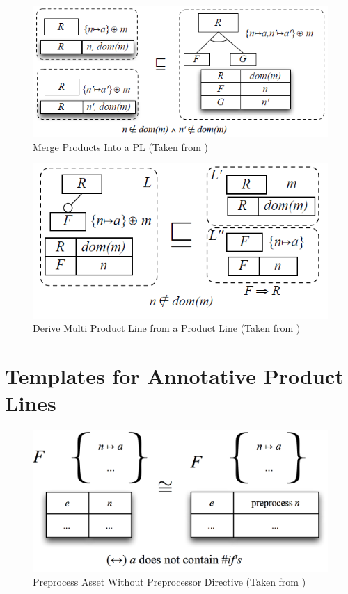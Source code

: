 \documentclass[12pt]{article}
\begin{document}
\begin{figure}[H]
\centering
\includegraphics[width=1\textwidth, frame]{images/MergeProductsIntoAPL}
\caption{Merge Products Into a PL (Taken from \cite{phdlmt})}
\end{figure}

\begin{figure}[H]
\centering
\includegraphics[width=1\textwidth, frame]{images/DeriveMultiProductLine}
\caption{Derive Multi Product Line from a Product Line (Taken from \cite{phdlmt})}
\end{figure}

\pagebreak
\section{Templates for Annotative Product Lines}

\begin{figure}[H]
\centering
\includegraphics[width=1\textwidth, frame]{images/Template1T}
\caption{Preprocess Asset Without Preprocessor Directive (Taken from \cite{twiki})}
\end{figure}
\end{document}
